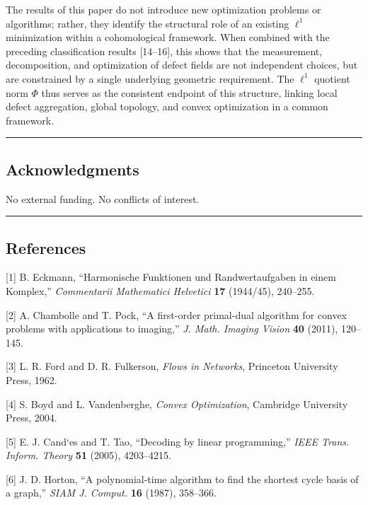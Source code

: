 \documentclass[
]{article}
\begin{document}
The results of this paper do not introduce new optimization problems or
algorithms; rather, they identify the structural role of an existing
\(\ell^1\) minimization within a cohomological framework. When combined
with the preceding classification results {[}14--16{]}, this shows that
the measurement, decomposition, and optimization of defect fields are
not independent choices, but are constrained by a single underlying
geometric requirement. The \(\ell^1\) quotient norm \(\Phi\) thus serves
as the consistent endpoint of this structure, linking local defect
aggregation, global topology, and convex optimization in a common
framework.

\begin{center}\rule{0.5\linewidth}{0.5pt}\end{center}

\subsection{Acknowledgments}\label{acknowledgments}

No external funding. No conflicts of interest.

\begin{center}\rule{0.5\linewidth}{0.5pt}\end{center}

\subsection{References}\label{references}

{[}1{]} B. Eckmann, ``Harmonische Funktionen und Randwertaufgaben in
einem Komplex,'' \emph{Commentarii Mathematici Helvetici} \textbf{17}
(1944/45), 240--255.

{[}2{]} A. Chambolle and T. Pock, ``A first-order primal-dual algorithm
for convex problems with applications to imaging,'' \emph{J. Math.
Imaging Vision} \textbf{40} (2011), 120--145.

{[}3{]} L. R. Ford and D. R. Fulkerson, \emph{Flows in Networks},
Princeton University Press, 1962.

{[}4{]} S. Boyd and L. Vandenberghe, \emph{Convex Optimization},
Cambridge University Press, 2004.

{[}5{]} E. J. Cand`es and T. Tao, ``Decoding by linear programming,''
\emph{IEEE Trans. Inform. Theory} \textbf{51} (2005), 4203--4215.

{[}6{]} J. D. Horton, ``A polynomial-time algorithm to find the shortest
cycle basis of a graph,'' \emph{SIAM J. Comput.} \textbf{16} (1987),
358--366.
\end{document}

